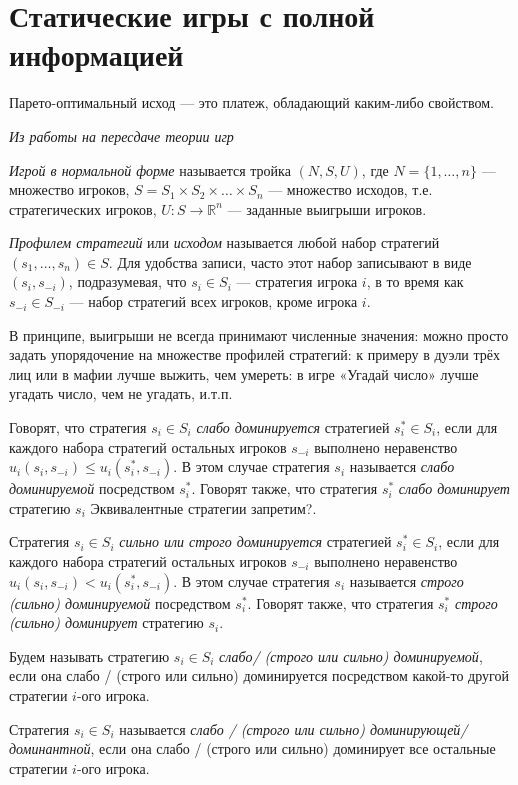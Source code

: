 \section{Статические игры с полной информацией} %

Парето-оптимальный исход — это платеж, обладающий каким-либо свойством.

{\it Из работы на пересдаче теории игр}

{\it Игрой в нормальной форме} называется тройка $ (N,S,U)$, где $N=\{1,\dots,n\}$ — множество игроков, $S=S_1 \times S_2 \times \ldots \times S_n$ — множество исходов, т.е. стратегических игроков, $U: S \to \mathbb{R}^n$ — заданные выигрыши игроков.

{\it Профилем стратегий}  или {\it исходом} называется любой набор стратегий $(s_1,\ldots,s_n) \in S $. Для удобства записи, часто этот набор записывают в виде $(s_i,s_{-i})$, подразумевая, что $s_i \in S_i$ — стратегия игрока $i$, в то время как  $s_{-i} \in S_{-i}$ — набор стратегий всех игроков, кроме игрока $i$.

В принципе, выигрыши не всегда принимают численные значения: можно просто задать упорядочение на множестве профилей стратегий: к примеру в дуэли трёх лиц или в мафии лучше выжить, чем умереть: в игре «Угадай число» лучше угадать число, чем не угадать, и.т.п.

Говорят, что стратегия $s_i \in S_i$ {\it слабо доминируется} стратегией $s^*_i \in S_i$, если для каждого набора стратегий остальных игроков $s_{-i}$ выполнено неравенство $u_i(s_i,s_{-i}) \leq u_i(s^*_i,s_{-i}).$ В этом случае стратегия $s_i$ называется {\it слабо доминируемой} посредством $s^*_i$. Говорят также, что стратегия $s^*_i$ {\it слабо доминирует} стратегию $s_i$ {\red Эквивалентные стратегии запретим?}.

Стратегия $s_i \in S_i$ {\it сильно или строго доминируется} стратегией $s^*_i \in S_i$, если для каждого набора стратегий остальных игроков $s_{-i}$ выполнено неравенство $u_i(s_i,s_{-i}) < u_i(s^*_i,s_{-i}).$ В этом случае стратегия $s_i$ называется {\it строго (сильно) доминируемой} посредством $s^*_i$. Говорят также, что стратегия $s^*_i$ {\it строго (сильно) доминирует} стратегию $s_i$.

Будем называть стратегию  $s_i \in S_i$ {\it слабо/ (строго или сильно) доминируемой}, если она слабо / (строго или сильно) доминируется посредством какой-то другой стратегии $i$-ого игрока.

Стратегия $s_i \in S_i$ называется {\it слабо / (строго или сильно) доминирующей/доминантной}, если она слабо / (строго или сильно) доминирует все остальные стратегии $i$-ого игрока.

